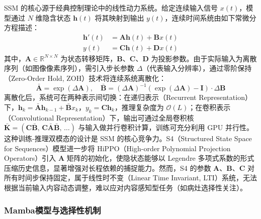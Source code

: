 \documentclass[12pt, a4paper, twoside]{article}
\begin{document}
SSM 的核心源于经典控制理论中的线性动力系统。给定连续输入信号 $x(t)$，模型通过 $N$ 维隐含状态 $\mathbf{h}(t)$ 将其映射到输出 $y(t)$，连续时间系统由如下常微分方程描述：
\begin{equation}
\begin{aligned}
\mathbf{h}'(t) &= \mathbf{A}\mathbf{h}(t) + \mathbf{B}x(t) \\
y(t) &= \mathbf{C}\mathbf{h}(t) + \mathbf{D}x(t)
\end{aligned}
\end{equation}
其中，$\mathbf{A} \in \mathbb{R}^{N \times N}$ 为状态转移矩阵，$\mathbf{B}$、$\mathbf{C}$、$\mathbf{D}$ 为投影参数。由于实际输入为离散序列（如图像像素序列），需引入步长参数 $\Delta$（代表输入分辨率），通过零阶保持（Zero-Order Hold, ZOH）技术将连续系统离散化：
\begin{equation}
\bar{\mathbf{A}} = \exp(\Delta\mathbf{A}), \quad
\bar{\mathbf{B}} = (\Delta\mathbf{A})^{-1}\!\left(\exp(\Delta\mathbf{A}) - \mathbf{I}\right) \cdot \Delta\mathbf{B}
\end{equation}
离散化后，系统可在两种表示间切换：在递归表示（Recurrent Representation）下，$\mathbf{h}_k = \bar{\mathbf{A}}\mathbf{h}_{k-1} + \bar{\mathbf{B}}x_k$，$y_k = \mathbf{C}\mathbf{h}_k$，推理复杂度为 $\mathcal{O}(L)$；在卷积表示（Convolutional Representation）下，输出可通过全局卷积核 $\bar{\mathbf{K}} = (\mathbf{C}\bar{\mathbf{B}},\, \mathbf{C}\bar{\mathbf{A}}\bar{\mathbf{B}},\, \ldots)$ 与输入做并行卷积计算，训练可充分利用 GPU 并行性。这种训练-推理双模态的设计是 SSM 的核心竞争力。S4（Structured State Space for Sequences）模型进一步将 HiPPO（High-order Polynomial Projection Operators）引入 $\mathbf{A}$ 矩阵的初始化，使隐状态能够以 Legendre 多项式系数的形式压缩历史信息，显著增强对长程依赖的捕捉能力。然而，S4 的参数 $\mathbf{A}$、$\mathbf{B}$、$\mathbf{C}$ 对所有时间步保持固定，属于线性时不变（Linear Time Invariant, LTI）系统，无法根据当前输入内容动态调整，难以应对内容感知型任务（如病灶选择性关注）。

\subsubsection{Mamba模型与选择性机制}
\end{document}

